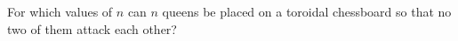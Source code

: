 For which values of $n$ can $n$ queens be placed on a toroidal chessboard so that no two of them attack each other?
